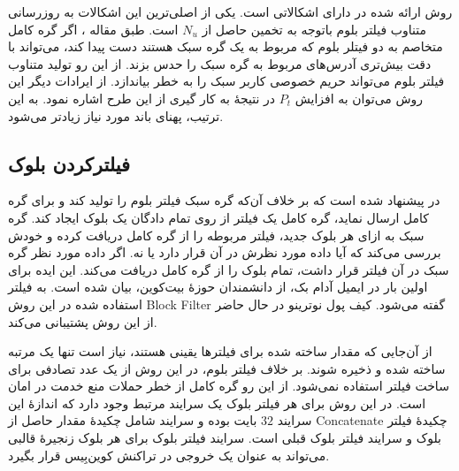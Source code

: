 روش ارائه شده در \cite{Kanemura2017} دارای اشکالاتی است. یکی از اصلی‌ترین این اشکالات به روزرسانی متناوب فیلتر بلوم باتوجه به تخمین حاصل از $N_u$  است. طبق مقاله \cite{Gervais2014}، اگر گره کامل متخاصم به دو فیتلر بلوم که مربوط به یک گره سبک هستند دست پیدا کند، می‌تواند با دقت بیش‌تری آدرس‌های مربوط به گره سبک را حدس بزند. از این رو تولید متناوب فیلتر بلوم می‌تواند حریم خصوصی کاربر سبک را به خطر بیاندازد.
از ایرادات دیگر این روش می‌توان به افزایش $P_t$ در نتیجهٔ به کار گیری از این طرح اشاره نمود. به این ترتیب، پهنای باند مورد نیاز زیادتر می‌شود. 

\subsection{فیلترکردن بلوک}
\label{BIP157}
در \cite{Osuntokun2017} پیشنهاد شده است که بر خلاف آن‌که گره سبک فیلتر بلوم را تولید کند و برای گره کامل ارسال نماید، گره کامل یک فیلتر از روی تمام دادگان یک بلوک ایجاد ‌کند. گره سبک به ازای هر بلوک جدید، فیلتر مربوطه را از گره کامل دریافت کرده و خودش بررسی می‌کند که آیا داده مورد نظرش در آن قرار دارد یا نه. اگر داده مورد نظر گره سبک در آن فیلتر قرار داشت، تمام بلوک را از گره کامل دریافت می‌کند. این ایده برای اولین بار در ایمیل آدام بک، از دانشمندان حوزهٔ بیت‌کوین، بیان شده است\cite{Back2015}. به فیلتر استفاده شده در این روش 
\gls{Block Filter}
 گفته می‌شود. کیف پول 
 نوترینو
در حال حاضر از این روش پشتیبانی می‌کند.

از آن‌جایی که مقدار ساخته شده برای فیلتر‌ها یقینی هستند، نیاز است تنها یک مرتبه ساخته شده و ذخیره شوند. بر خلاف فیلتر بلوم، در این روش از یک عدد تصادفی برای ساخت فیلتر استفاده نمی‌شود. از این رو گره کامل از خطر حملات منع خدمت در امان است. در این روش برای هر فیلتر بلوک یک سرایند مرتبط وجود دارد که اندازهٔ این سرایند $32$ بایت بوده و سرایند شامل چکیدهٔ مقدار حاصل از 
\gls{Concatenate}
چکیدهٔ فیلتر بلوک و سرایند فیلتر بلوک قبلی است. سرایند فیلتر بلوک برای هر بلوک زنجیرهٔ قالبی می‌تواند به عنوان یک خروجی  در تراکنش کوین‌بِیس قرار بگیرد. 


